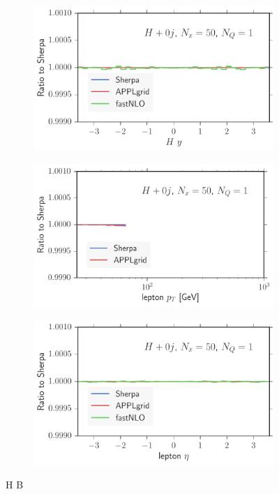 %
\begin{figure}
\centering
\hfill
\begin{subfigure}[]{0.49\textwidth}
	\includegraphics[width=\textwidth]{images/hb_hy.pdf}
\end{subfigure}

\begin{subfigure}[]{0.49\textwidth}
	\includegraphics[width=\textwidth]{images/hb_lpt.pdf}
\end{subfigure}
\hfill
\begin{subfigure}[]{0.49\textwidth}
	\includegraphics[width=\textwidth]{images/hb_leta.pdf}
\end{subfigure}
\caption{H B}
\end{figure}

